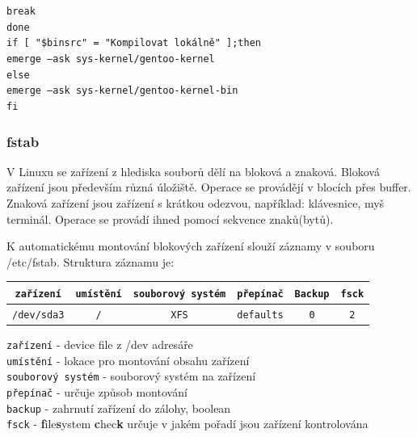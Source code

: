 \documentclass[12pt,a4paper,twoside,]{article}
\begin{document}
\hspace*{1.5em}\texttt{break}\\
\texttt{done}\\
\texttt{if [ "\$binsrc" = "Kompilovat lokálně" ];then}\\
\texttt{\hspace*{1.5em}emerge --ask sys-kernel/gentoo-kernel}\\
\texttt{else}\\
\texttt{\hspace*{1.5em}emerge --ask sys-kernel/gentoo-kernel-bin}\\
\texttt{fi}\\
\newpage
\subsubsection{\textsf{fstab}}
V Linuxu se zařízení z hlediska souborů dělí na bloková a znaková. Bloková zařízení jsou především různá úložiště. Operace se provádějí v blocích přes buffer. Znaková zařízení jsou zařízení s krátkou odezvou, například: klávesnice, myš terminál. Operace se provádí ihned pomocí sekvence znaků(bytů).

K automatickému montování blokových zařízení slouží záznamy v souboru /etc/fstab. Struktura záznamu je:

\begin{table}[h]
	\begin{tabular}{|c|c|c|c|c|c|}
		\hline
		\texttt{zařízení} & \texttt{umístění} & \texttt{souborový systém} & \texttt{přepínač} & \texttt{Backup} & \texttt{fsck} \\
		\hline
		\texttt{/dev/sda3} & \texttt{/} & \texttt{XFS} & \texttt{defaults} & \texttt{0} & \texttt{2} \\
		\hline
		
	\end{tabular}
\end{table}
\hspace*{-1.5em}\texttt{zařízení} - device file z /dev adresáře\\
\texttt{umístění} - lokace pro montování obsahu zařízení \\
\texttt{souborový systém} - souborový systém na zařízení\\
\texttt{přepínač} - určuje způsob montování\\
\texttt{backup} - zahrnutí zařízení do zálohy, boolean\\
\texttt{fsck} - {\bf f}ile{\bf s}ystem {\bf c}hec{\bf k} určuje v jakém pořadí jsou zařízení kontrolována\\
\end{document}
